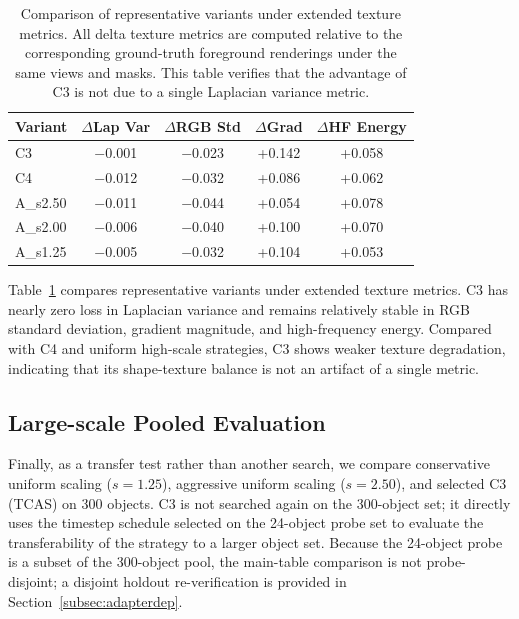 \documentclass[times,twocolumn,final]{elsarticle}
\begin{document}
\FloatBarrier

\begin{table}[h!]
\centering
\caption{Comparison of representative variants under extended texture metrics. All delta texture metrics are computed relative to the corresponding ground-truth foreground renderings under the same views and masks. This table verifies that the advantage of C3 is not due to a single Laplacian variance metric.}
\label{tab:extended}
\small
\begin{tabular}{lcccc}
\toprule
Variant & $\Delta$Lap Var & $\Delta$RGB Std & $\Delta$Grad & $\Delta$HF Energy \\
\midrule
C3 & $-$0.001 & $-$0.023 & +0.142 & +0.058 \\
C4 & $-$0.012 & $-$0.032 & +0.086 & +0.062 \\
A\_s2.50 & $-$0.011 & $-$0.044 & +0.054 & +0.078 \\
A\_s2.00 & $-$0.006 & $-$0.040 & +0.100 & +0.070 \\
A\_s1.25 & $-$0.005 & $-$0.032 & +0.104 & +0.053 \\
\bottomrule
\end{tabular}
\end{table}

Table~\ref{tab:extended} compares representative variants under extended texture metrics. C3 has nearly zero loss in Laplacian variance and remains relatively stable in RGB standard deviation, gradient magnitude, and high-frequency energy. Compared with C4 and uniform high-scale strategies, C3 shows weaker texture degradation, indicating that its shape-texture balance is not an artifact of a single metric.

\FloatBarrier

\subsection{Large-scale Pooled Evaluation}
\label{subsec:largescale}

Finally, as a transfer test rather than another search, we compare conservative uniform scaling ($s = 1.25$), aggressive uniform scaling ($s = 2.50$), and selected C3 (TCAS) on 300 objects. C3 is not searched again on the 300-object set; it directly uses the timestep schedule selected on the 24-object probe set to evaluate the transferability of the strategy to a larger object set. Because the 24-object probe is a subset of the 300-object pool, the main-table comparison is not probe-disjoint; a disjoint holdout re-verification is provided in Section~\ref{subsec:adapterdep}.
\end{document}
